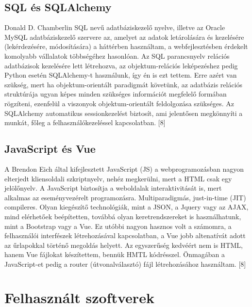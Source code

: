 \documentclass[12pt,a4paper]{report}
\begin{document}
\subsection{SQL és SQLAlchemy}

Donald D. Chamberlin SQL nevű adatbáziskezelő nyelve, illetve az Oracle MySQL 
adatbáziskezelő szervere az, amelyet az adatok letárolására és kezelésére (lekérdezésére, 
módosítására) a háttérben használtam, a webfejlesztésben érdekelt komolyabb vállalatok 
többségéhez hasonlóan. Az SQL parancsnyelv relációs adatbázisok kezelésére lett létrehozva, 
az objektum-relációs leképezéshez pedig Python esetén SQLAlchemy-t használunk, így én is ezt 
tettem. Erre azért van szükség, mert ha objektum-orientált paradigmát követünk, az adatbázis 
relációs struktúrája ugyan képes minden szükséges információt megfelelő formában rögzíteni, 
ezenfelül a viszonyok objektum-orientált feldolgozása szükséges. Az SQLAlchemy automatikus 
sessionkezelést biztosít, ami jelentősen megkönnyíti a munkát, főleg a felhasználókezeléssel 
kapcsolatban. [8]

\subsection{JavaScript és Vue}

A Brendon Eich által kifejlesztett JavaScript (JS) a webprogramozásban nagyon elterjedt
kliensoldali szkriptnyelv, nehéz megkerülni, mert a HTML csak egy jelölőnyelv. A JavaScript 
biztosítja a weboldalak interaktivitását is, mert alkalmas az eseményvezérelt programozásra. 
Multiparadigmás, just-in-time (JIT) compileres. Olyan kiegészítő technológiák, mint a JSON, 
a Jquery vagy az AJAX, mind elérhetőek beépítetten, továbbá olyan keretrendszereket is 
használhatunk, mint a Bootstrap vagy a Vue. Ez utóbbi nagyon hasznos volt a számomra, a 
felhasználói interfészek létrehozásával kapcsolatban, a Vue jobb altenatívát adott az 
űrlapokkal történő megoldás helyett. Az egyszerűség kedvéért nem is HTML, hanem Vue fájlokat
készítettem, bennük HMTL kódrésszel. Önmagában a JavaScript-et pedig a router 
(útvonalválasztó) fájl létrehozásához használtam. [8]

\section{Felhasznált szoftverek}
\end{document}
